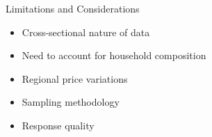 \documentclass{beamer}
\begin{document}
\begin{frame}{Limitations and Considerations}
    \begin{itemize}
        \item Cross-sectional nature of data
        \item Need to account for household composition
        \item Regional price variations
        \item Sampling methodology
        \item Response quality
    \end{itemize}
\end{frame}
\end{document}
